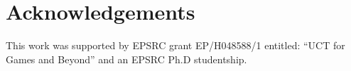 \documentclass[conference]{IEEEtran}
\begin{document}
 
\section*{Acknowledgements}
This work was supported by EPSRC grant EP/H048588/1 entitled: ``UCT for Games and Beyond'' and an EPSRC Ph.D studentship. 





\end{document}
